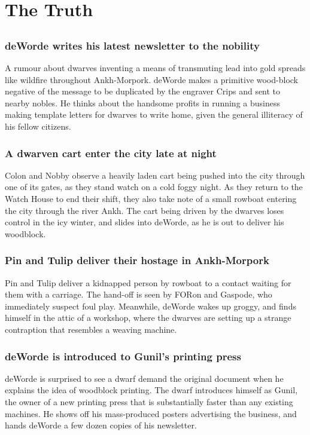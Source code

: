 \section{The Truth}


\subsection{}
\subsubsection{\Gls{deWorde} writes his latest newsletter to the nobility}
A rumour about dwarves inventing a means of transmuting lead into gold spreads like wildfire
throughout Ankh-Morpork. \Gls{deWorde} makes a primitive wood-block negative of the message to be
duplicated by the engraver \Gls{Crips} and sent to nearby nobles. He thinks about the handsome
profits in running a business making template letters for dwarves to write home, given the general
illiteracy of his fellow citizens.

\subsubsection{A dwarven cart enter the city late at night}
\Gls{Colon} and \Gls{Nobby} observe a heavily laden cart being pushed into the city through one of
its gates, as they stand watch on a cold foggy night. As they return to the Watch House to end their
shift, they also take note of a small rowboat entering the city through the river Ankh. The
cart being driven by the dwarves loses control in the icy winter, and slides into \Gls{deWorde},
as he is out to deliver his woodblock.

\subsubsection{\Gls{Pin} and \Gls{Tulip} deliver their hostage in Ankh-Morpork}
\Gls{Pin} and \Gls{Tulip} deliver a kidnapped person by rowboat to a contact waiting for them
with a carriage. The hand-off is seen by \Gls{FORon} and \Gls{Gaspode}, who immediately suspect
foul play. Meanwhile, \Gls{deWorde} wakes up groggy, and finds himself in the attic of a workshop,
where the dwarves are setting up a strange contraption that resembles a weaving machine.

\subsubsection{\Gls{deWorde} is introduced to \Gls{Gunil}'s printing press}
\Gls{deWorde} is surprised to see a dwarf demand the original document when he explains the idea
of woodblock printing. The dwarf introduces himself as \Gls{Gunil}, the owner of a new printing
press that is substantially faster than any existing machines. He shows off his mass-produced
posters advertising the business, and hands \Gls{deWorde} a few dozen copies of his newsletter.

